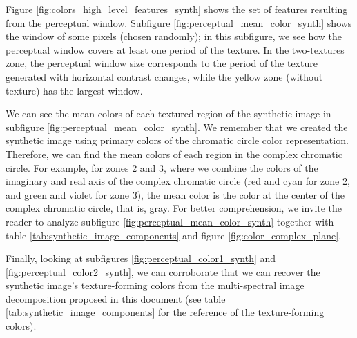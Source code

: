 \documentclass[journal]{IEEEtran}
\begin{document}
Figure \ref{fig:colors_high_level_features_synth} shows the set of features resulting from the perceptual window. Subfigure \ref{fig:perceptual_mean_color_synth} shows the window of some pixels (chosen randomly); in this subfigure, we see how the perceptual window covers at least one period of the texture. In the two-textures zone, the perceptual window size corresponds to the period of the texture generated with horizontal contrast changes, while the yellow zone (without texture) has the largest window. 

We can see the mean colors of each textured region of the synthetic image in subfigure \ref{fig:perceptual_mean_color_synth}. We remember that we created the synthetic image using primary colors of the chromatic circle color representation. Therefore, we can find the mean colors of each region in the complex chromatic circle. For example, for zones 2 and 3, where we combine the colors of the imaginary and real axis of the complex chromatic circle (red and cyan for zone 2, and green and violet for zone 3), the mean color is the color at the center of the complex chromatic circle, that is, gray. For better comprehension, we invite the reader to analyze subfigure \ref{fig:perceptual_mean_color_synth} together with table \ref{tab:synthetic_image_components} and figure \ref{fig:color_complex_plane}.

Finally, looking at subfigures \ref{fig:perceptual_color1_synth} and \ref{fig:perceptual_color2_synth}, we can corroborate that we can recover the synthetic image's texture-forming colors from the multi-spectral image decomposition proposed in this document (see table \ref{tab:synthetic_image_components} for the reference of the texture-forming colors).
\end{document}
